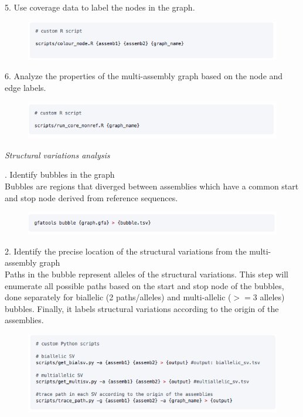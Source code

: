 \documentclass[../main.tex]{subfiles}
\begin{document}
\begin{flushleft}
\begin{figure}[!htb]
    \end{figure}
5. Use coverage data to label the nodes in the graph. \\
    \begin{figure}[!htb]
        \centering
        \includegraphics[width=\textwidth]{paper3/supplement/sp425.png}
    \end{figure}

6. Analyze the properties of the multi-assembly graph based on the node and edge labels. \\
    \begin{figure}[!htb]
        \centering
        \includegraphics[width=\textwidth]{paper3/supplement/sp426.png}
    \end{figure}

\bigskip

\emph{Structural variations analysis}

. Identify bubbles in the graph \\ Bubbles are regions that diverged between assemblies which have a common start and stop node derived from reference sequences. \\
\begin{figure}[!htb]
    \centering
    \includegraphics[width=\textwidth]{paper3/supplement/sp429.png}
\end{figure}

2. Identify the precise location of the structural variations from the multi-assembly graph \\ Paths in the bubble represent alleles of the structural variations. This step will enumerate all possible paths based on the start and stop node of the bubbles, done separately for biallelic (2 paths/alleles) and multi-allelic ($>=$3 alleles) bubbles. Finally, it labels structural variations according to the origin of the assemblies. \\ 
\begin{figure}[!htb]
    \centering
    \includegraphics[width=\textwidth]{paper3/supplement/sp430.png}
\end{figure}


\end{flushleft}
\end{document}
